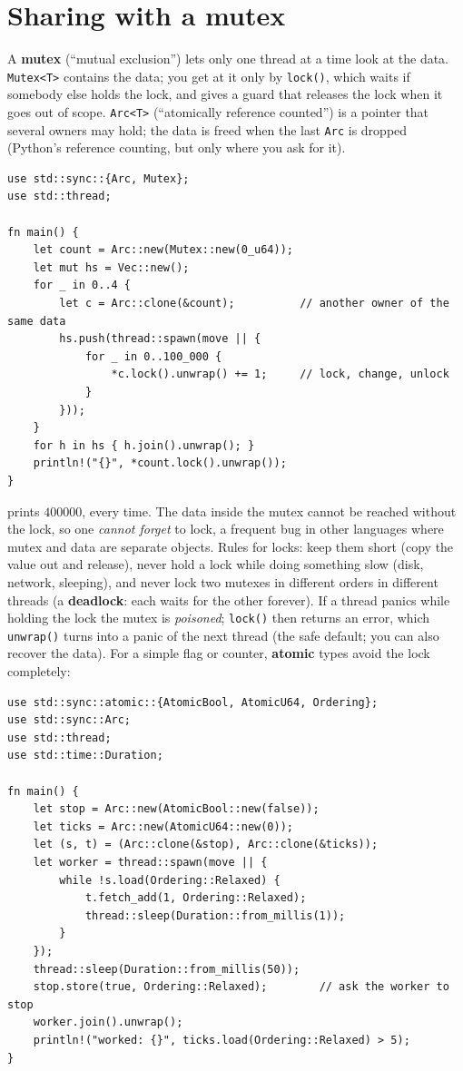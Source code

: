 \section*{Sharing with a mutex}
A \textbf{mutex} (``mutual exclusion'') lets only one thread at a time look at the data. \verb!Mutex<T>! contains the data; you get at it only by \verb!lock()!, which waits if somebody else holds the lock, and gives a guard that releases the lock when it goes out of scope. \verb!Arc<T>! (``atomically reference counted'') is a pointer that several owners may hold; the data is freed when the last \verb!Arc! is dropped (Python's reference counting, but only where you ask for it).
\begin{verbatim}
use std::sync::{Arc, Mutex};
use std::thread;

fn main() {
    let count = Arc::new(Mutex::new(0_u64));
    let mut hs = Vec::new();
    for _ in 0..4 {
        let c = Arc::clone(&count);          // another owner of the same data
        hs.push(thread::spawn(move || {
            for _ in 0..100_000 {
                *c.lock().unwrap() += 1;     // lock, change, unlock
            }
        }));
    }
    for h in hs { h.join().unwrap(); }
    println!("{}", *count.lock().unwrap());
}
\end{verbatim}
prints $400000$, every time. The data inside the mutex cannot be reached without the lock, so one \emph{cannot forget} to lock, a frequent bug in other languages where mutex and data are separate objects. Rules for locks: keep them short (copy the value out and release), never hold a lock while doing something slow (disk, network, sleeping), and never lock two mutexes in different orders in different threads (a \textbf{deadlock}: each waits for the other forever). If a thread panics while holding the lock the mutex is \emph{poisoned}; \verb!lock()! then returns an error, which \verb!unwrap()! turns into a panic of the next thread (the safe default; you can also recover the data). For a simple flag or counter, \textbf{atomic} types avoid the lock completely:
\begin{verbatim}
use std::sync::atomic::{AtomicBool, AtomicU64, Ordering};
use std::sync::Arc;
use std::thread;
use std::time::Duration;

fn main() {
    let stop = Arc::new(AtomicBool::new(false));
    let ticks = Arc::new(AtomicU64::new(0));
    let (s, t) = (Arc::clone(&stop), Arc::clone(&ticks));
    let worker = thread::spawn(move || {
        while !s.load(Ordering::Relaxed) {
            t.fetch_add(1, Ordering::Relaxed);
            thread::sleep(Duration::from_millis(1));
        }
    });
    thread::sleep(Duration::from_millis(50));
    stop.store(true, Ordering::Relaxed);        // ask the worker to stop
    worker.join().unwrap();
    println!("worked: {}", ticks.load(Ordering::Relaxed) > 5);
}
\end{verbatim}
